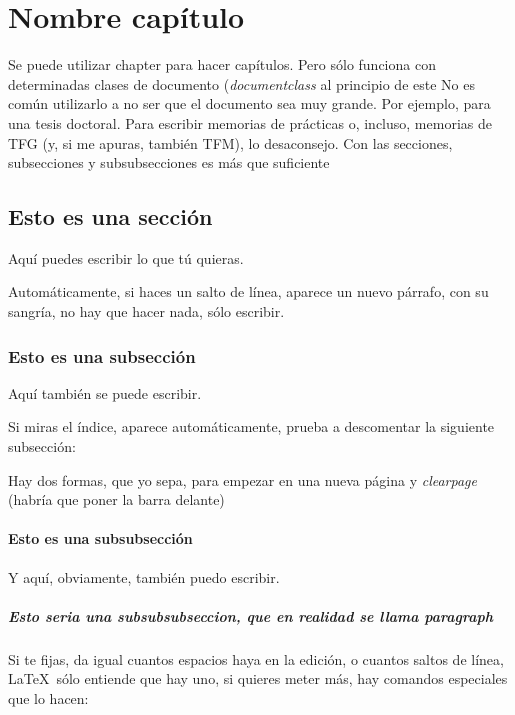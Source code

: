 \documentclass{article}
\begin{document}
\chapter{Nombre capítulo}
Se puede utilizar chapter para hacer capítulos. Pero sólo funciona con determinadas clases de documento (\textit{documentclass} al principio de este No es común utilizarlo a no ser que el documento sea muy grande. Por ejemplo, para una tesis doctoral. Para escribir memorias de prácticas o, incluso, memorias de TFG (y, si me apuras, también TFM), lo desaconsejo. Con las secciones, subsecciones y subsubsecciones es más que suficiente

\section{Esto es una sección}
\label{sec:seccion1}
Aquí puedes escribir lo que tú quieras.

Automáticamente, si haces un salto de línea, aparece un nuevo párrafo, con su sangría, no hay que hacer nada, sólo escribir.

\subsection{Esto es una subsección}
Aquí también se puede escribir.

Si miras el índice, aparece automáticamente, prueba a descomentar la siguiente subsección:


Hay dos formas, que yo sepa, para empezar en una nueva página
\newpage
y \textit{clearpage} (habría que poner la barra delante)

\subsubsection{Esto es una subsubsección}
Y aquí, obviamente, también puedo escribir.

\paragraph{Esto seria una subsubsubseccion, que en realidad se llama paragraph}


Si te fijas, da igual cuantos espacios       haya en la edición, o cuantos saltos de línea, \LaTeX \ sólo entiende que hay uno, si quieres meter más, hay comandos especiales que lo hacen:
\end{document}
